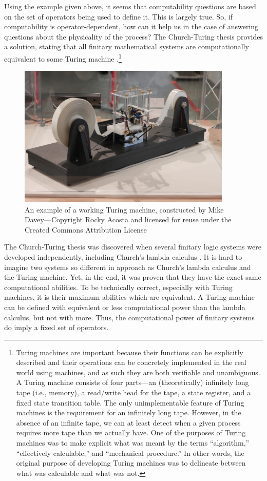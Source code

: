 Using the example given above, it seems that computability questions are based on the set of operators being used to define it.  This is largely true.  So, if computability is operator-dependent, how can it help us in the case of answering questions about the physicality of the process?  The Church-Turing thesis provides a solution, stating that all finitary mathematical systems are computationally equivalent to some Turing machine \citep{turing1937,turing1939}.\footnote{Turing machines are important because their functions can be explicitly described and their operations can be concretely implemented in the real world using machines, and as such they are both verifiable and unambiguous.  A Turing machine consists of four parts---an (theoretically) infinitely long tape (i.e., memory), a read/write head for the tape, a state register, and a fixed state transition table.  The only unimplementable feature of Turing machines is the requirement for an infinitely long tape.  However, in the absence of an infinite tape, we can at least detect when a given process requires more tape than we actually have.  One of the purposes of Turing machines was to make explicit what was meant by the terms ``algorithm,'' ``effectively calculable,'' and ``mechanical procedure.''  In other words, the original purpose of developing Turing machines was to delineate between what was calculable and what was not.}

\begin{figure}[H]
\centering
\includegraphics[width=4in]{TuringMachineDavey.jpg}
\caption{An example of a working Turing machine, constructed by Mike Davey---Copyright  Rocky Acosta and licensed for reuse under the Created Commons Attribution License}
\end{figure}

The Church-Turing thesis was discovered when several finitary logic systems were developed independently, including Church's lambda calculus \citep{church1936,turing1937}.  It is hard to imagine two systems so different in approach as Church's lambda calculus and the Turing machine.  Yet, in the end, it was proven that they have the exact same computational abilities.  To be technically correct, especially with Turing machines, it is their maximum abilities which are equivalent.  A Turing machine can be defined with equivalent or less computational power than the lambda calculus, but not with more.  Thus, the computational power of finitary systems do imply a fixed set of operators.  

